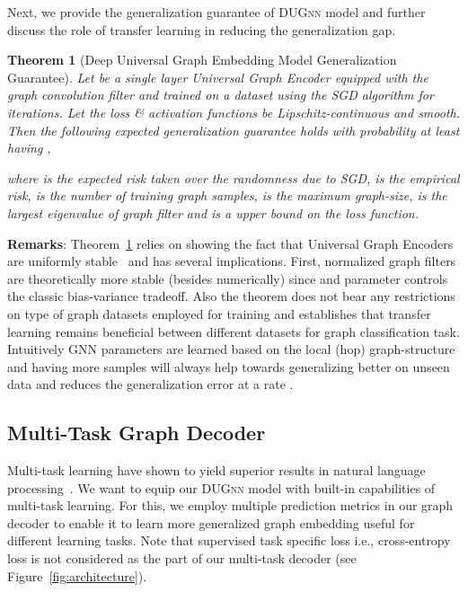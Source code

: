 \documentclass{article}
\newtheorem{theorem}{Theorem}
\begin{document}
Next, we provide the generalization guarantee of  \textsc{DUGnn} model and further discuss  the role of transfer learning in   reducing the generalization gap.
\begin{theorem}[Deep Universal Graph Embedding Model Generalization Guarantee]\label{thm:gcnn_gen_bound} \textit{Let  be a  single layer Universal Graph Encoder        equipped with the graph convolution filter   and trained on a dataset    using  the SGD algorithm for  iterations. Let the loss \& activation functions be Lipschitz-continuous and smooth. Then the  following expected generalization guarantee   holds with probability at least   having ,}
\vspace{-0.5em} 	
	 
	\vspace{-0.5em}
	
	where    is the expected risk taken over   the randomness due to SGD,    is the empirical risk,  is the number of training graph samples,  is the maximum graph-size,  is the largest eigenvalue of graph filter  and   is a upper bound on the loss function.
\end{theorem} 
\vspace{-0.5em}
\noindent\textbf{{Remarks}}: Theorem~\ref{thm:gcnn_gen_bound} relies on showing the fact that Universal Graph Encoders are uniformly stable~\cite{bousquet2002stability} and  has several implications. First, normalized graph filters   are   theoretically more stable (besides numerically) since   and parameter  controls the classic bias-variance tradeoff.  Also the theorem   does not bear any restrictions on type of graph datasets employed for training and establishes that transfer learning remains beneficial between different datasets for graph classification task. Intuitively GNN parameters are learned based  on   the local (hop) graph-structure and having more samples will always help   towards generalizing better on unseen data and    reduces the generalization error at a rate .

\vspace{-0.8em}
\subsection{Multi-Task Graph Decoder}
\vspace{-0.7em}
Multi-task learning     have shown to yield superior results in natural language processing~\cite{mccann2018natural, devlin2018bert}. We want to equip our  \textsc{DUGnn}  model with built-in capabilities of multi-task learning. For this, we employ multiple prediction metrics in our graph decoder to enable it to learn more generalized graph embedding useful for different learning tasks. Note that supervised task specific  loss i.e.,  cross-entropy loss   is not considered as the part of our multi-task decoder (see Figure~\ref{fig:architecture}).
\end{document}
